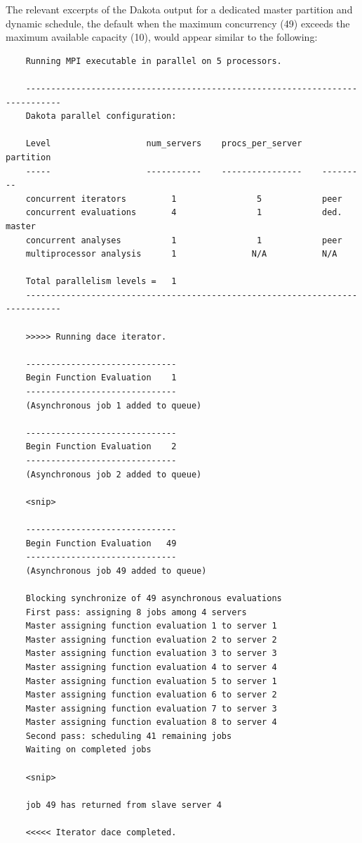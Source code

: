 The relevant excerpts of the Dakota output for a dedicated master
partition and dynamic schedule, the default when the maximum concurrency
(49) exceeds the maximum available capacity (10), would appear similar
to the following:
\begin{small}
\begin{verbatim}
    Running MPI executable in parallel on 5 processors.

    -----------------------------------------------------------------------------
    Dakota parallel configuration:

    Level                   num_servers    procs_per_server    partition
    -----                   -----------    ----------------    ---------
    concurrent iterators         1                5            peer
    concurrent evaluations       4                1            ded. master
    concurrent analyses          1                1            peer
    multiprocessor analysis      1               N/A           N/A

    Total parallelism levels =   1
    -----------------------------------------------------------------------------

    >>>>> Running dace iterator.

    ------------------------------
    Begin Function Evaluation    1
    ------------------------------
    (Asynchronous job 1 added to queue)

    ------------------------------
    Begin Function Evaluation    2
    ------------------------------
    (Asynchronous job 2 added to queue)

    <snip>

    ------------------------------
    Begin Function Evaluation   49
    ------------------------------
    (Asynchronous job 49 added to queue)

    Blocking synchronize of 49 asynchronous evaluations
    First pass: assigning 8 jobs among 4 servers
    Master assigning function evaluation 1 to server 1
    Master assigning function evaluation 2 to server 2
    Master assigning function evaluation 3 to server 3
    Master assigning function evaluation 4 to server 4
    Master assigning function evaluation 5 to server 1
    Master assigning function evaluation 6 to server 2
    Master assigning function evaluation 7 to server 3
    Master assigning function evaluation 8 to server 4
    Second pass: scheduling 41 remaining jobs
    Waiting on completed jobs

    <snip>

    job 49 has returned from slave server 4

    <<<<< Iterator dace completed.
\end{verbatim}
\end{small}
